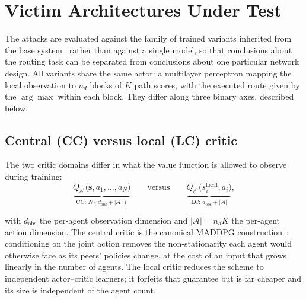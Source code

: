 
\section{Victim Architectures Under Test}
\label{sec:victim_architectures}

The attacks are evaluated against the family of trained variants inherited from the
base system~\cite{amaral2021maddpg-routing} rather than against a single model, so
that conclusions about the routing task can be separated from conclusions about one
particular network design. All variants share the same actor: a multilayer
perceptron mapping the local observation to $n_d$ blocks of $K$ path scores, with
the executed route given by the $\arg\max$ within each block. They differ along
three binary axes, described below.

\subsection{Central (CC) versus local (LC) critic}
\label{subsec:axis_critic_domain}

The two critic domains differ in what the value function is allowed to observe
during training:
\begin{equation}
  \underbrace{Q_{\phi^i}\big(\mathbf{s}, a_1, \dots, a_N\big)}_{\text{CC:\ } N(d_{\text{obs}} + |\mathcal{A}|)}
  \qquad\text{versus}\qquad
  \underbrace{Q_{\phi^i}\big(s^{\text{local}}_i, a_i\big)}_{\text{LC:\ } d_{\text{obs}} + |\mathcal{A}|},
  \label{eq:arch_critic_domains}
\end{equation}

\noindent with $d_{\text{obs}}$ the per-agent observation dimension and
$|\mathcal{A}| = n_d K$ the per-agent action dimension. The central critic is the
canonical MADDPG construction~\cite{lowe2017multi}: conditioning on the joint action
removes the non-stationarity each agent would otherwise face as its peers' policies
change, at the cost of an input that grows linearly in the number of agents. The
local critic reduces the scheme to independent actor--critic learners; it forfeits
that guarantee but is far cheaper and its size is independent of the agent count.

